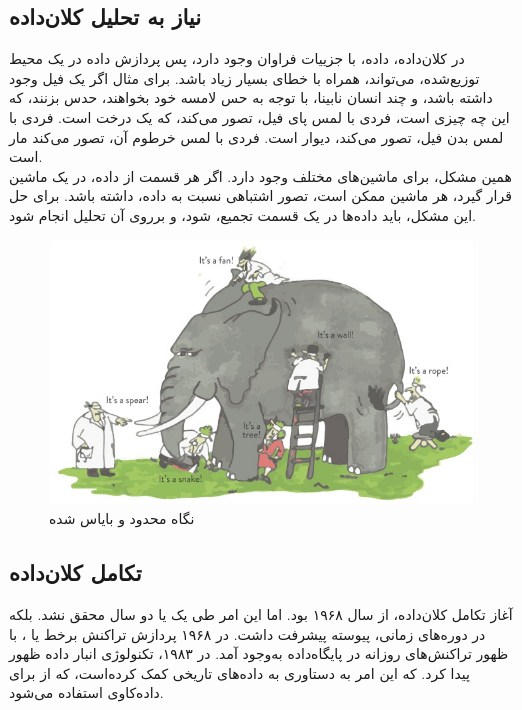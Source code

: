 \documentclass[12pt,onecolumn,a4paper]{article}
\begin{document}
\subsection{نیاز به تحلیل کلان‌داده}
در کلان‌داده، داده، با جزییات فراوان وجود دارد، پس پردازش داده در یک محیط توزیع‌شده، می‌تواند، همراه با خطای بسیار زیاد باشد. برای مثال اگر یک فیل وجود داشته باشد،
و چند انسان نابینا، با توجه به حس لامسه خود بخواهند، حدس بزنند، که این چه چیزی است، فردی با لمس پای فیل، تصور می‌کند، که یک درخت است.
فردی با لمس بدن فیل،‌ تصور می‌کند، دیوار است. فردی با لمس خرطوم آن، تصور می‌کند مار است. \\
همین مشکل، برای ماشین‌های مختلف وجود دارد. اگر هر قسمت از داده، در یک ماشین قرار گیرد، هر ماشین ممکن است،‌ تصور اشتباهی نسبت به داده، داشته باشد. برای حل این مشکل،
باید داده‌ها در یک قسمت تجمیع،‌ شود، و برروی آن تحلیل انجام شود. \\

\begin{figure}[h!]
\centering
	\includegraphics[width=1.2\textwidth]{elephant-and-blinds.jpg}
	\caption{ نگاه محدود و بایاس شده}
\end{figure}

\subsection{تکامل کلان‌داده}
آغاز تکامل کلان‌داده، از سال ۱۹۶۸ بود. اما این امر طی یک یا دو سال محقق نشد. بلکه در دوره‌های زمانی، پیوسته پیشرفت داشت. در ۱۹۶۸ پردازش تراکنش برخط یا ، با ظهور تراکنش‌های روزانه در پایگاه‌داده به‌وجود آمد.
در ۱۹۸۳، تکنولوژی انبار داده ظهور پیدا کرد. که این امر به دستاوری به داده‌های تاریخی کمک کرده‌است، که از  برای داده‌کاوی استفاده می‌شود.
\end{document}
